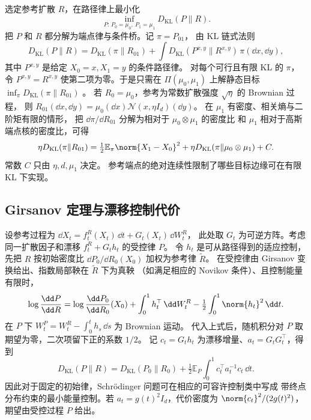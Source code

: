 选定参考扩散 \(R\)，在路径律上最小化
\begin{equation}
  \inf_{P:\,P_0=\mu_0,\ P_1=\mu_1}D_{\mathrm{KL}}(P\|R).
  \label{eq:training-sb-primal}
\end{equation}
把 \(P\) 和 \(R\) 都分解为端点律与条件桥。记 \(\pi=P_{01}\)，
由 KL 链式法则
\[
  D_{\mathrm{KL}}(P\|R)
   =D_{\mathrm{KL}}(\pi\|R_{01})
      +\int D_{\mathrm{KL}}(P^{x,y}\|R^{x,y})\,\pi(\dd x,\dd y),
\]
其中 \(P^{x,y}\) 是给定 \(X_0=x,X_1=y\) 的条件路径律。
对每个可行且有限 KL 的 \(\pi\)，令 \(P^{x,y}=R^{x,y}\)
使第二项为零。于是只需在 \(\Pi(\mu_0,\mu_1)\)
上解静态目标 \(\inf_\pi D_{\mathrm{KL}}(\pi\|R_{01})\)
\cite{leonard2014schrodinger}。
若 \(R_0=\mu_0\)，参考为常数扩散强度 \(\sqrt{\eta}\) 的 Brownian 过程，
则 \(R_{01}(\dd x,\dd y)=\mu_0(\dd x)\mathcal N(x,\eta I_d)(\dd y)\)。
在 \(\mu_1\) 有密度、相关熵与二阶矩有限的情形，
把 \(\dd \pi/\dd R_{01}\) 分解为相对于 \(\mu_0\otimes\mu_1\) 的密度比
和 \(\mu_1\) 相对于高斯端点核的密度比，可得
\begin{equation}
  \eta D_{\mathrm{KL}}(\pi\|R_{01})
   =\tfrac12\mathbb E_\pi\norm{X_1-X_0}^2
           +\eta D_{\mathrm{KL}}(\pi\|\mu_0\otimes\mu_1)+C .
  \label{eq:training-sb-entropic-cost}
\end{equation}
常数 \(C\) 只由 \(\eta,d,\mu_1\) 决定。
参考端点的绝对连续性限制了哪些目标边缘可在有限 KL 下实现。

\subsection{Girsanov 定理与漂移控制代价\requiredderivation}
\label{subsec:girsanov-cost}

设参考过程为 \(\dd X_t=f_t^R(X_t)\,\dd t+G_t(X_t)\,\dd W_t^R\)，
此处取 \(G_t\) 为可逆方阵。考虑同一扩散因子和漂移 \(f_t^R+G_t h_t\) 的受控律 \(P\)。
令 \(h_t\) 是可从路径得到的适应控制，先把 \(R\) 按初始密度比
\(\dd P_0/\dd R_0(X_0)\) 加权为参考律 \(\widetilde R\)。
在受控律由 Girsanov 变换给出、指数局部鞅在 \(\widetilde R\) 下为真鞅
（如满足相应的 Novikov 条件）、且控制能量有限时，
\[
  \log\frac{\dd P}{\dd R}
   =\log\frac{\dd P_0}{\dd R_0}(X_0)
      +\int_0^1 h_t^\top\,\dd W_t^R-\tfrac12\int_0^1\norm{h_t}^2\,\dd t .
\]
在 \(P\) 下 \(W_t^P=W_t^R-\int_0^t h_s\,\dd s\) 为 Brownian 运动。
代入上式后，随机积分对 \(P\) 取期望为零，二次项留下正的系数 \(1/2\)。
记 \(c_t=G_th_t\) 为漂移增量、\(a_t=G_tG_t^\top\)，得到
\begin{equation}
  D_{\mathrm{KL}}(P\|R)
    =D_{\mathrm{KL}}(P_0\|R_0)
       +\tfrac12\mathbb E_P\int_0^1 c_t^\top a_t^{-1}c_t\,\dd t .
  \label{eq:training-girsanov}
\end{equation}
因此对于固定的初始律，Schrödinger 问题可在相应的可容许控制类中写成
带终点分布约束的最小能量控制。若 \(a_t=g(t)^2 I_d\)，代价密度为
\(\norm{c_t}^2/(2g(t)^2)\)，期望由受控过程 \(P\) 给出。

